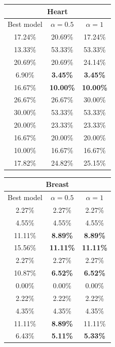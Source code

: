 \documentclass[a4paper,12pt ]{report}
\begin{document}
\begin{table}[h]
\begin{minipage}{0.55\textwidth}
\begin{tabular}{|c | c | c | }
      \hline 
      \end{tabular}

\end{minipage}%

\end{table}


\begin{table}[h]


\begin{minipage}{0.55\textwidth}
      \centering
           \begin{tabular}{|c | c | c | }
      \hline
      \multicolumn{3}{|c|}{Heart}  \\
      \hline
      Best model & $ \alpha = 0.5 $ & $ \alpha = 1 $ \\  \hline
	17.24\% & 	20.69\% & 	17.24\% \\ 
	13.33\% & 	53.33\% & 	53.33\% \\ 
	20.69\% & 	20.69\% & 	24.14\% \\ 
	6.90\% & 	\textbf{3.45\% } &   \textbf{3.45\%}  \\ 
	16.67\% & 	\textbf{10.00\%}  & 	\textbf{10.00\%} \\ 
	26.67\% & 	26.67\% & 	30.00\% \\ 
	30.00\% & 	53.33\% & 	53.33\% \\ 
	20.00\% & 	23.33\% & 	23.33\% \\ 
	16.67\% & 	20.00\% & 	20.00\% \\ 
	10.00\% & 	16.67\% & 	16.67\% \\ \hline \hline
	 17.82\% & 	 24.82\% & 	 25.15\% \\
  
      \hline 
      \end{tabular}

\end{minipage}%
\begin{minipage}{0.55\textwidth}
      \centering
           \begin{tabular}{|c | c | c | }
      \hline
      \multicolumn{3}{|c|}{Breast}  \\
      \hline
      Best model & $ \alpha = 0.5 $ & $ \alpha = 1 $ \\  \hline
2.27\% & 	2.27\% & 	2.27\% \\
4.55\% & 	4.55\% & 	4.55\% \\
11.11\% & 	\textbf{8.89\% } & 	\textbf{8.89\%} \\ 
15.56\% & 	\textbf{11.11\% } & 	\textbf{11.11\%} \\ 
2.27\% & 	2.27\% & 	2.27\% \\ 
10.87\% & 	\textbf{6.52\% } & 	\textbf{6.52\%} \\ 
0.00\% & 	0.00\% & 	0.00\% \\ 
2.22\% & 	2.22\% & 	2.22\% \\ 
4.35\% & 	4.35\% & 	4.35\% \\ 
11.11\% & 	\textbf{8.89\%} & 	11.11\% \\  \hline  \hline
 6.43\%	&  \textbf{5.11\%}	&  \textbf{5.33\%} \\
       \hline 
 

\end{tabular}
\end{minipage}
\end{table}
\end{document}
